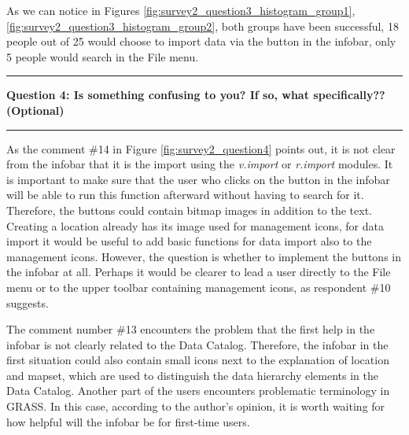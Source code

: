 \documentclass[a4paper,10pt,twoside]{article}
\begin{document}
\noindent As we can notice in Figures \ref{fig:survey2_question3_histogram_group1},
\ref{fig:survey2_question3_histogram_group2}, both groups have been
successful, 18 people out of 25 would choose to import data via the
button in the infobar, only 5 people would search in the File menu.

\par\noindent\rule{\textwidth}{0.4pt}
\noindent \textbf{Question 4: Is something confusing to you? If so, what specifically?? (Optional)}
\par\noindent\rule{\textwidth}{0.4pt}

\noindent As the comment \#14 in Figure \ref{fig:survey2_question4}
points out, it is not clear from the infobar that it is the import
using the \textit{v.import} or \textit{r.import} modules. It is
important to make sure that the user who clicks on the button in the
infobar will be able to run this function afterward without having
to search for it. Therefore, the buttons could contain bitmap images
in addition to the text. Creating a location already has its image
used for management icons, for data import it would be useful to add
basic functions for data import also to the management icons. However,
the question is whether to implement the buttons in the infobar at
all. Perhaps it would be clearer to lead a user directly to the File
menu or to the upper toolbar containing management icons, as
respondent \#10 suggests.

The comment number \#13 encounters the problem that the
first help in the infobar is not clearly related to the Data
Catalog. Therefore, the infobar in the first situation could also
contain small icons next to the explanation of location and mapset,
which are used to distinguish the data hierarchy elements in the Data
Catalog. Another part of the users encounters problematic terminology
in GRASS. In this case, according to the author's opinion, it is worth
waiting for how helpful will the infobar be for first-time
users. 
\end{document}

